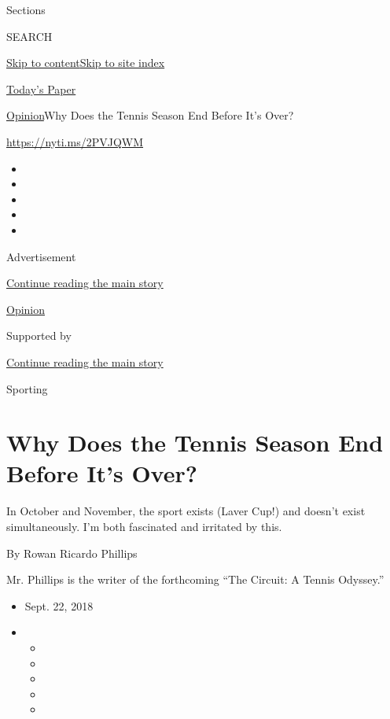 Sections

SEARCH

\protect\hyperlink{site-content}{Skip to
content}\protect\hyperlink{site-index}{Skip to site index}

\href{https://myaccount.nytimes3xbfgragh.onion/auth/login?response_type=cookie\&client_id=vi}{}

\href{https://www.nytimes3xbfgragh.onion/section/todayspaper}{Today's
Paper}

\href{/section/opinion}{Opinion}\textbar{}Why Does the Tennis Season End
Before It's Over?

\url{https://nyti.ms/2PVJQWM}

\begin{itemize}
\item
\item
\item
\item
\item
\end{itemize}

Advertisement

\protect\hyperlink{after-top}{Continue reading the main story}

\href{/section/opinion}{Opinion}

Supported by

\protect\hyperlink{after-sponsor}{Continue reading the main story}

Sporting

\hypertarget{why-does-the-tennis-season-end-before-its-over}{%
\section{Why Does the Tennis Season End Before It's
Over?}\label{why-does-the-tennis-season-end-before-its-over}}

In October and November, the sport exists (Laver Cup!) and doesn't exist
simultaneously. I'm both fascinated and irritated by this.

By Rowan Ricardo Phillips

Mr. Phillips is the writer of the forthcoming ``The Circuit: A Tennis
Odyssey.''

\begin{itemize}
\item
  Sept. 22, 2018
\item
  \begin{itemize}
  \item
  \item
  \item
  \item
  \item
  \end{itemize}
\end{itemize}

